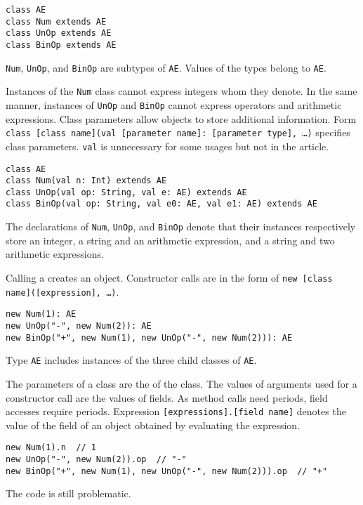 \begin{verbatim}
class AE
class Num extends AE
class UnOp extends AE
class BinOp extends AE
\end{verbatim}

\verb!Num!, \verb!UnOp!, and \verb!BinOp! are subtypes of \verb!AE!. Values of
the types belong to \verb!AE!.

Instances of the \verb!Num! class cannot express integers whom they denote. In
the same manner, instances of \verb!UnOp! and \verb!BinOp! cannot express
operators and arithmetic expressions. Class parameters allow objects to store
additional information. Form \verb!class [class name](val [parameter name]: [parameter type], …)!
specifies class parameters. \verb!val! is unnecessary for
some usages but not in the article.

\begin{verbatim}
class AE
class Num(val n: Int) extends AE
class UnOp(val op: String, val e: AE) extends AE
class BinOp(val op: String, val e0: AE, val e1: AE) extends AE
\end{verbatim}

The declarations of \verb!Num!, \verb!UnOp!, and \verb!BinOp! denote that their
instances respectively store an integer, a string and an arithmetic expression,
and a string and two arithmetic expressions.

Calling a  creates an object. Constructor calls are in the form
of \verb!new [class name]([expression], …)!.

\begin{verbatim}
new Num(1): AE
new UnOp("-", new Num(2)): AE
new BinOp("+", new Num(1), new UnOp("-", new Num(2))): AE
\end{verbatim}

Type \verb!AE! includes instances of the three child classes of \verb!AE!.

The parameters of a class are the  of the class. The values of
arguments used for a constructor call are the values of fields. As method calls
need periods, field accesses require periods. Expression
\verb![expressions].[field name]! denotes the value of the field of an object
obtained by evaluating the expression.

\begin{verbatim}
new Num(1).n  // 1
new UnOp("-", new Num(2)).op  // "-"
new BinOp("+", new Num(1), new UnOp("-", new Num(2))).op  // "+"
\end{verbatim}

The code is still problematic.

